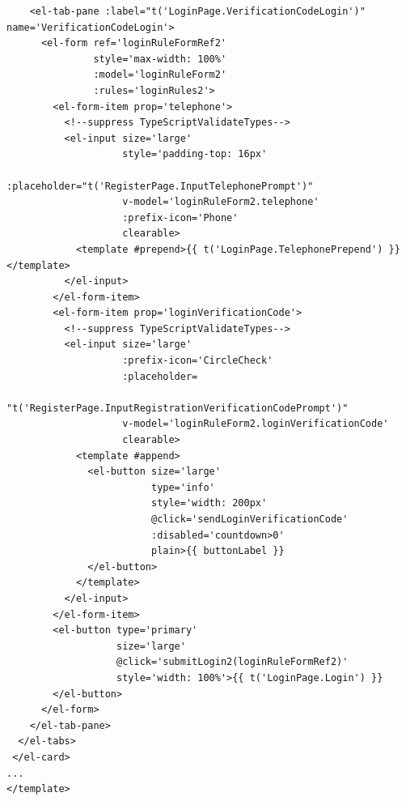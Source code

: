 \begin{itemize}
\begin{verbatim}
    <el-tab-pane :label="t('LoginPage.VerificationCodeLogin')" name='VerificationCodeLogin'>
      <el-form ref='loginRuleFormRef2'
               style='max-width: 100%'
               :model='loginRuleForm2'
               :rules='loginRules2'>
        <el-form-item prop='telephone'>
          <!--suppress TypeScriptValidateTypes-->
          <el-input size='large'
                    style='padding-top: 16px'
                    :placeholder="t('RegisterPage.InputTelephonePrompt')"
                    v-model='loginRuleForm2.telephone'
                    :prefix-icon='Phone'
                    clearable>
            <template #prepend>{{ t('LoginPage.TelephonePrepend') }}</template>
          </el-input>
        </el-form-item>
        <el-form-item prop='loginVerificationCode'>
          <!--suppress TypeScriptValidateTypes-->
          <el-input size='large'
                    :prefix-icon='CircleCheck'                    
                    :placeholder=
                    "t('RegisterPage.InputRegistrationVerificationCodePrompt')"
                    v-model='loginRuleForm2.loginVerificationCode'
                    clearable>
            <template #append>
              <el-button size='large'
                         type='info'
                         style='width: 200px'
                         @click='sendLoginVerificationCode'
                         :disabled='countdown>0'
                         plain>{{ buttonLabel }}
              </el-button>
            </template>
          </el-input>
        </el-form-item>
        <el-button type='primary'
                   size='large'
                   @click='submitLogin2(loginRuleFormRef2)'
                   style='width: 100%'>{{ t('LoginPage.Login') }}
        </el-button>
      </el-form>
    </el-tab-pane>
  </el-tabs>
 </el-card>
...
</template>
	\end{verbatim}
	

\end{itemize}
